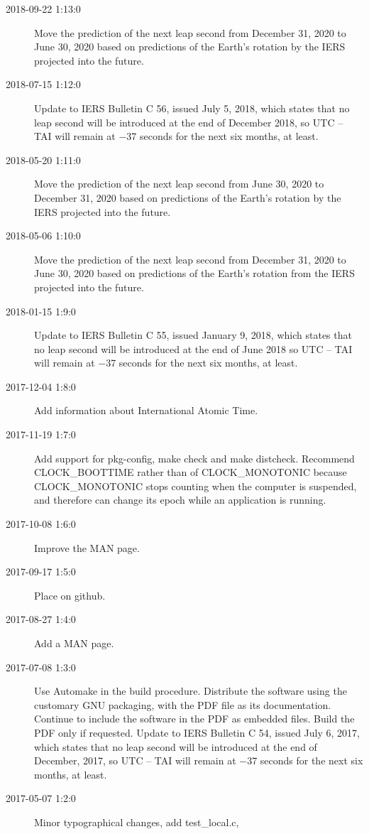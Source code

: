 \documentclass[letterpaper,twoside]{article}
\begin{document}
\begin{description}
\item[2018-09-22 1:13:0] Move the prediction of the next leap second
  from December 31, 2020 to June 30, 2020 based on predictions of
  the Earth's rotation by the IERS projected into the future.
\item[2018-07-15 1:12:0] Update to IERS Bulletin C 56, issued July
  5, 2018, which states that no leap second will be introduced
  at the end of December 2018, so UTC -- TAI will remain at
  \num{-37} seconds for the next six months, at least.
\item[2018-05-20 1:11:0] Move the prediction of the next leap second
  from June 30, 2020 to December 31, 2020 based on predictions of
  the Earth's rotation by the IERS projected into the future.
\item[2018-05-06 1:10:0] Move the prediction of the next leap second
  from December 31, 2020 to June 30, 2020 based on predictions
  of the Earth's rotation from the IERS projected into the future.
\item[2018-01-15 1:9:0] Update to IERS Bulletin C 55, issued
  January 9, 2018, which states that no leap second will be introduced
  at the end of June 2018 so UTC -- TAI will remain at \num{-37} seconds
  for the next six months, at least.
\item[2017-12-04 1:8:0] Add information about International Atomic Time.
\item[2017-11-19 1:7:0] Add support for pkg-config, make check and
  make distcheck.  Recommend CLOCK\_BOOTTIME rather than of CLOCK\_MONOTONIC
  because CLOCK\_MONOTONIC stops counting when the computer is suspended,
  and therefore can change its epoch while an application is running.
\item[2017-10-08 1:6:0] Improve the MAN page.
\item[2017-09-17 1:5:0] Place on github.
\item[2017-08-27 1:4:0] Add a MAN page.
\item[2017-07-08 1:3:0] Use Automake in the build procedure.
  Distribute the software using the customary GNU packaging,
  with the PDF file as its documentation.  Continue to include
  the software in the PDF as embedded files.  Build the PDF
  only if requested.  Update to IERS Bulletin C 54, issued
  July 6, 2017, which states that no leap second will be introduced
  at the end of December, 2017, so UTC -- TAI will remain at
  \num{-37} seconds for the next six months, at least.
\item[2017-05-07 1:2:0] Minor typographical changes, add test\_local.c,

\end{description}
\end{document}
